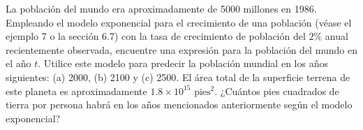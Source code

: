 \item La población del mundo era aproximadamente de 5000 millones en 1986. Empleando el modelo exponencial para el crecimiento de una población (véase el ejemplo 7 o la sección 6.7) con la tasa de crecimiento de población del $2\%$ anual recientemente observada, encuentre una expresión para la población del mundo en el año $t$. Utilice este modelo para predecir la población mundial en los años siguientes: (a) 2000, (b) 2100 y (c) 2500. El área total de la superficie terrena de este planeta es aproximadamente $1.8 \times 10^{15} \text{ pies}^2$. ¿Cuántos pies cuadrados de tierra por persona habrá en los años mencionados anteriormente según el modelo exponencial?
